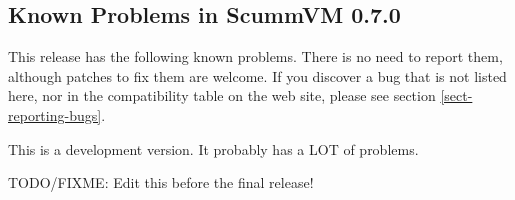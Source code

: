 

\subsection{Known Problems in ScummVM 0.7.0}

This release has the following known problems. There is no need to report them,
although patches to fix them are welcome. If you discover a bug that is not
listed here, nor in the compatibility table on the web site, please see
section \ref{sect-reporting-bugs}.

This is a development version. It probably has a LOT of problems. 

TODO/FIXME: Edit this before the final release!
